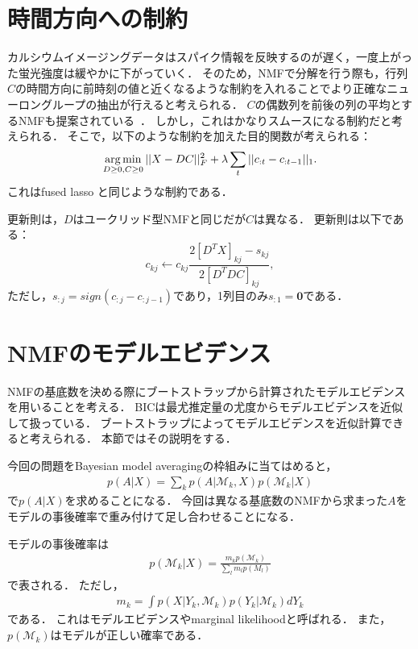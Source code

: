 \section{時間方向への制約}
カルシウムイメージングデータはスパイク情報を反映するのが遅く，一度上がった蛍光強度は緩やかに下がっていく．
そのため，NMFで分解を行う際も，行列$C$の時間方向に前時刻の値と近くなるような制約を入れることでより正確なニューロングループの抽出が行えると考えられる．
$C$の偶数列を前後の列の平均とするNMFも提案されている~\cite{Cheung2015}．
しかし，これはかなりスムースになる制約だと考えられる．
そこで，以下のような制約を加えた目的関数が考えられる：
\begin{equation}
	\operatorname*{arg\,min}_{D \geq 0, C \geq 0}||X - DC||^2_F + \lambda \sum_t||c_{:t} - c_{:t-1}||_1.
  \label{eq:NMF-ar}
\end{equation}
これはfused lasso \cite{Tibshirani2005}と同じような制約である．

更新則は，$D$はユークリッド型NMFと同じだが$C$は異なる．
更新則は以下である：
\begin{equation}
	c_{kj} \leftarrow c_{kj} \frac{2[D^T X]_{kj} - s_{kj}}{2[D^T DC]_{kj}},
\end{equation}
ただし，$s_{:j} = sign(c_{:j} - c_{:j-1})$であり，1列目のみ$s_{:1} = \mathbf{0}$である．

\section{NMFのモデルエビデンス}
NMFの基底数を決める際にブートストラップから計算されたモデルエビデンスを用いることを考える．
BICは最尤推定量の尤度からモデルエビデンスを近似して扱っている．
ブートストラップによってモデルエビデンスを近似計算できると考えられる．
本節ではその説明をする．

今回の問題をBayesian model averagingの枠組みに当てはめると，
\begin{align}
	p(A|X) = \sum_k p(A|\mathcal{M}_k, X) p(\mathcal{M}_k | X)
\end{align}
で$p(A|X)$を求めることになる．
今回は異なる基底数のNMFから求まった$A$をモデルの事後確率で重み付けて足し合わせることになる．

モデルの事後確率は
\begin{align}
	p(\mathcal{M}_k|X) = \frac{m_k p(\mathcal{M}_k)}{\sum_l m_l p(M_l)}
\end{align}
で表される．
ただし，
\begin{align}
	m_k = \int p(X | Y_k, \mathcal{M}_k) p(Y_k| \mathcal{M}_k) dY_k
	\label{eq:evidence}
\end{align}
である．
これはモデルエビデンスやmarginal likelihoodと呼ばれる．
また，$p(\mathcal{M}_k)$はモデルが正しい確率である．

